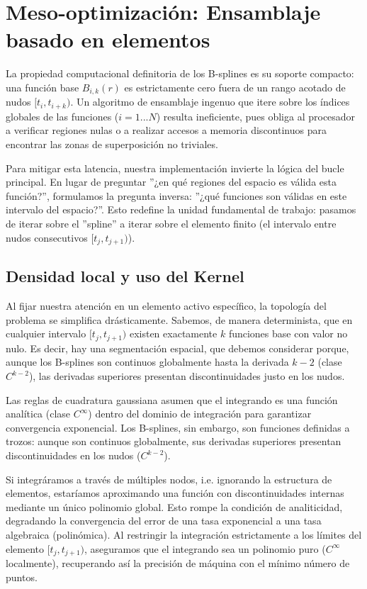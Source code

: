 \section{Meso-optimización: Ensamblaje basado en elementos}

La propiedad computacional definitoria de los B-splines es su soporte compacto: una función base \( B_{i,k}(r) \) es estrictamente cero fuera de un rango acotado de nudos \( [t_i,t_{i+k}) \). Un algoritmo de ensamblaje ingenuo que itere sobre los índices globales de las funciones (\( i = 1...N \)) resulta ineficiente, pues obliga al procesador a verificar regiones nulas o a realizar accesos a memoria discontinuos para encontrar las zonas de superposición no triviales.

Para mitigar esta latencia, nuestra implementación invierte la lógica del bucle principal. En lugar de preguntar ”¿en qué regiones del espacio es válida esta función?”, formulamos la pregunta inversa: ”¿qué funciones son válidas en este intervalo del espacio?”. Esto redefine la unidad fundamental de trabajo: pasamos de iterar sobre el ”spline” a iterar sobre el elemento finito (el intervalo entre nudos consecutivos \( [t_j, t_{j+1}) \)).

\subsection{Densidad local y uso del Kernel}

Al fijar nuestra atención en un elemento activo específico, la topología del problema se simplifica drásticamente. Sabemos, de manera determinista, que en cualquier intervalo \( [t_j, t_{j+1}) \) existen exactamente \( k \) funciones base con valor no nulo. Es decir, hay una segmentación espacial, que debemos considerar porque, aunque los B-splines son continuos globalmente hasta la derivada \( k-2 \) (clase \( C^{k-2} \)), las derivadas superiores presentan discontinuidades justo en los nudos.

Las reglas de cuadratura gaussiana asumen que el integrando es una función analítica (clase \( C^{\infty} \)) dentro del dominio de integración para garantizar convergencia exponencial. Los B-splines, sin embargo, son funciones definidas a trozos: aunque son continuos globalmente, sus derivadas superiores presentan discontinuidades en los nudos (\( C^{k-2} \)).

Si integráramos a través de múltiples nodos, i.e. ignorando la estructura de elementos, estaríamos aproximando una función con discontinuidades internas mediante un único polinomio global. Esto rompe la condición de analiticidad, degradando la convergencia del error de una tasa exponencial a una tasa algebraica (polinómica). Al restringir la integración estrictamente a los límites del elemento \( [t_j,t_{j+1}) \), aseguramos que el integrando sea un polinomio puro (\( C^{\infty} \) localmente), recuperando así la precisión de máquina con el mínimo número de puntos.

